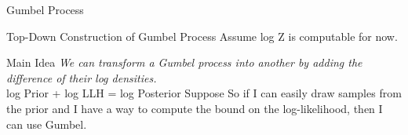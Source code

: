   

\begin{frame}{Gumbel Process}
\end{frame}



\begin{frame}{Top-Down Construction of Gumbel Process}
  Assume log Z is computable for now.
\end{frame}

\begin{frame}{Main Idea}
  \emph{We can transform a Gumbel process into another by adding the difference of their log densities.} \\
  log Prior + log LLH = log Posterior
  Suppose
  So if I can easily draw samples from the prior and I have a way to compute the bound on the log-likelihood, then I can use Gumbel.
\end{frame}

